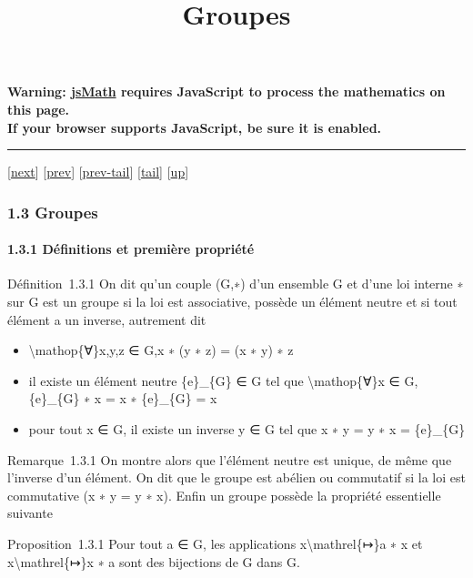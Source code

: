 \documentclass[]{article}
\title{Groupes}
\author{}
\date{}
\begin{document}
\maketitle

\textbf{Warning: \href{http://www.math.union.edu/locate/jsMath}{jsMath}
requires JavaScript to process the mathematics on this page.\\ If your
browser supports JavaScript, be sure it is enabled.}

\begin{center}\rule{3in}{0.4pt}\end{center}

{[}\href{coursse4.html}{next}{]} {[}\href{coursse2.html}{prev}{]}
{[}\href{coursse2.html\#tailcoursse2.html}{prev-tail}{]}
{[}\hyperref[tailcoursse3.html]{tail}{]}
{[}\href{coursch2.html\#coursse3.html}{up}{]}

\subsubsection{1.3 Groupes}

\paragraph{1.3.1 Définitions et première propriété}

Définition~1.3.1 On dit qu'un couple (G,∗) d'un ensemble G et d'une loi
interne ∗ sur G est un groupe si la loi est associative, possède un
élément neutre et si tout élément a un inverse, autrement dit

\begin{itemize}
\itemsep1pt\parskip0pt
\item
  \textbackslash{}mathop\{∀\}x,y,z ∈ G,x ∗ (y ∗ z) = (x ∗ y) ∗ z
\item
  il existe un élément neutre \{e\}\_\{G\} ∈ G tel que
  \textbackslash{}mathop\{∀\}x ∈ G, \{e\}\_\{G\} ∗ x = x ∗ \{e\}\_\{G\}
  = x
\item
  pour tout x ∈ G, il existe un inverse y ∈ G tel que x ∗ y = y ∗ x =
  \{e\}\_\{G\}
\end{itemize}

Remarque~1.3.1 On montre alors que l'élément neutre est unique, de même
que l'inverse d'un élément. On dit que le groupe est abélien ou
commutatif si la loi est commutative (x ∗ y = y ∗ x). Enfin un groupe
possède la propriété essentielle suivante

Proposition~1.3.1 Pour tout a ∈ G, les applications
x\textbackslash{}mathrel\{↦\}a ∗ x et x\textbackslash{}mathrel\{↦\}x ∗ a
sont des bijections de G dans G.
\end{document}
